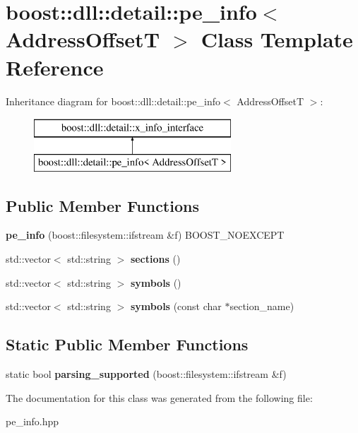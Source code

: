 \hypertarget{a00231}{}\section{boost\+:\+:dll\+:\+:detail\+:\+:pe\+\_\+info$<$ Address\+OffsetT $>$ Class Template Reference}
\label{a00231}
Inheritance diagram for boost\+:\+:dll\+:\+:detail\+:\+:pe\+\_\+info$<$ Address\+OffsetT $>$\+:\begin{figure}[H]
\begin{center}
\leavevmode
\includegraphics[height=2.000000cm]{a00231}
\end{center}
\end{figure}
\subsection*{Public Member Functions}
\begin{DoxyCompactItemize}
\item 
{\bfseries pe\+\_\+info} (boost\+::filesystem\+::ifstream \&f) B\+O\+O\+S\+T\+\_\+\+N\+O\+E\+X\+C\+E\+PT\hypertarget{a00231_a7163781ab5af1ea8119eb71fe4d67e9f}{}\label{a00231_a7163781ab5af1ea8119eb71fe4d67e9f}

\item 
std\+::vector$<$ std\+::string $>$ {\bfseries sections} ()\hypertarget{a00231_a4fb005ab609ec3c0bf48ae3537076815}{}\label{a00231_a4fb005ab609ec3c0bf48ae3537076815}

\item 
std\+::vector$<$ std\+::string $>$ {\bfseries symbols} ()\hypertarget{a00231_a7801ec9a67fe66f728fb7feb9faa617f}{}\label{a00231_a7801ec9a67fe66f728fb7feb9faa617f}

\item 
std\+::vector$<$ std\+::string $>$ {\bfseries symbols} (const char $\ast$section\+\_\+name)\hypertarget{a00231_ab5aee53c8aed8e3da1f2aa56ddc486e5}{}\label{a00231_ab5aee53c8aed8e3da1f2aa56ddc486e5}

\end{DoxyCompactItemize}
\subsection*{Static Public Member Functions}
\begin{DoxyCompactItemize}
\item 
static bool {\bfseries parsing\+\_\+supported} (boost\+::filesystem\+::ifstream \&f)\hypertarget{a00231_a74f919531d64b61f01779b050f2e8812}{}\label{a00231_a74f919531d64b61f01779b050f2e8812}

\end{DoxyCompactItemize}


The documentation for this class was generated from the following file\+:\begin{DoxyCompactItemize}
\item 
pe\+\_\+info.\+hpp\end{DoxyCompactItemize}
